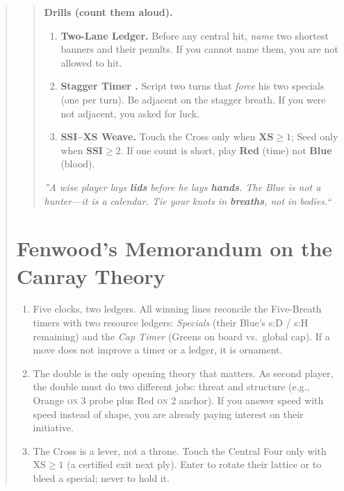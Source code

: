 \documentclass[11pt]{article}
\begin{document}
\begin{quote}
\begin{quote}
\medskip
\textbf{Drills (count them aloud).}
\begin{enumerate}\itemsep0.25em
  \item \textbf{Two-Lane Ledger.} Before any central hit, \emph{name} two shortest banners and their penults. If you cannot name them, you are not allowed to hit.
  \item \textbf{Stagger Timer .} Script two turns that \emph{force} his two specials (one per turn). Be adjacent on the stagger breath. If you were not adjacent, you asked for luck.
  \item \textbf{SSI--XS Weave.} Touch the Cross only when \(\textbf{XS}\ge1\); Seed only when \(\textbf{SSI}\ge2\). If one count is short, play \textbf{Red} (time) not \textbf{Blue} (blood).
\end{enumerate}

\medskip
\emph{''A wise player lays \textbf{lids} before he lays \textbf{hands}. The Blue is not a hunter---it is a calendar. Tie your knots in \textbf{breaths}, not in bodies.``}
\end{quote}
\clearpage
\section{Fenwood's Memorandum on the Canray Theory}
\label{sec:fenwood-memo}

\begin{tcolorbox}[enhanced,breakable,
  colback=royal!3, colframe=royal!70!black, boxrule=0.6pt,
  title={Fenwood's Memorandum on the Canray Theory}]
\begin{enumerate}[leftmargin=\textit{,itemsep=0.5em,label=\textbf{Thesis \Roman}.}]

\item Five clocks, two ledgers. All winning lines reconcile the Five-Breath timers with two resource ledgers: \emph{Specials} (their Blue's s{:}D / s{:}H remaining) and the \emph{Cap Timer } (Greens on board vs.\ global cap). If a move does not improve a timer or a ledger, it is ornament.

\item The double is the only opening theory that matters. As second player, the double must do two different jobs: threat and structure (e.g., Orange \textsc{on} 3 probe plus Red \textsc{on} 2 anchor). If you answer speed with speed instead of shape, you are already paying interest on their initiative.

\item The Cross is a lever, not a throne. Touch the Central Four only with $\mathrm{XS}\ge 1$ (a certified exit next ply). Enter to rotate their lattice or to bleed a special; never to hold it.


\end{enumerate}
\end{tcolorbox}
\end{quote}
\end{document}
